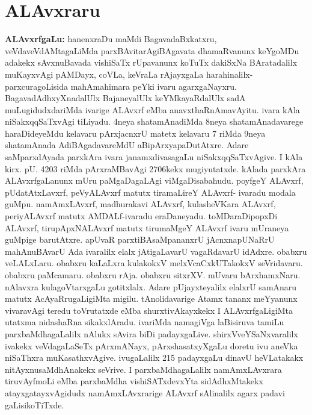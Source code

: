 \chapter{ALAvxraru}\label{chap008}

{\textbf{ALAvxrfgaLu:}} hanenxraDu maMdi BagavadaBxkatxru, veVdaveVdAMtagaLiMda parxBAvitarAgi\break BAgavata dhamaRvanunx keYgoMDu adakekx sAvxnuBavada vishiSaTx rUpavanunx koTuTx dakiSxNa BArata\-dalilx  muKayxvAgi pAMDayx, coVLa, keVraLa rAjayxgaLa harahinalilx-parxcuragoLisida mahAmahimara peYki ivaru agarxgaNayxru. BagavadAdhxyXnadalUlx BajaneyalUlx keYMkayaR\-dalUlx sadA muLugidudxdariMda ivarige ALAvxrf eMba anavxthaRnAmavAyitu. ivara kAla niSakxqqSaTxvAgi tiLiyadu. 4neya shatamAnadiMda 8neya shatamAnadavarege haraDideyeMdu kelavaru pArxjacnxrU matetx kelavaru 7 riMda 9neya shatamAnada AdiBAgadavareMdU aBipArxyapaDutAtxre. Adare saMparxdAyada parxkAra ivara janamxdivasagaLu niSakxqqSaTxvAgive. I kAla kirx. pU. 4203 riMda pArxraMBavAgi 2706kekx mugiyutatxde. kAlada parxkAra ALAvxrfgaLanunx mUru paMgaDagaLAgi viMgaDisabahudu. poyfgeY ALAvxrf, pUdatAtxLavxrf, peVyALAvxrf matutx tiramaLireY ALAvxrf- ivaradu modala guMpu. namAmxLAvxrf, madhurakavi ALAvxrf, kulasheVKara ALAvxrf, periyALAvxrf matutx AMDALf-ivaradu eraDaneyadu. toMDaraDipopxDi ALAvxrf, tirupApxNALAvxrf matutx tirumaMgeY ALAvxrf ivaru mUraneya guMpige barutAtxre. apUvaR parxtiBAsaMpananxrU jAcnxnapUNaRrU mahAnuBAvarU Ada ivaralilx elalx jAtigaLavarU vagaRdavarU idAdxre. obabxru veLALxLaru. obabxru kaLaLxra kulakokxV melxVcaCxkUTakokxV seVridavaru. obabxru paMcamaru. obabxru rAja. obabxru sitxrXV. mUvaru bArxhamxNaru. nAlavxra kulagoVtarxgaLu gotitxlalx. Adare pUjayxteyalilx elalxrU samAnaru matutx AcAyaRrugaLigiMta migilu. tAnolidavarige Atamx tananx meYyanunx vivaravAgi teredu toVrutatxde eMba shurxtivAkayxkekx I ALAvxrfgaLigiMta utatxma nidashaRna sikakxlAradu. ivariMda namagiVga laBisiruva tamiLu parxbaMdhagaLalilx nAlukx sAvira biDi padayxgaLive. shirxVveYSaNxvaralilx ivakekx veVdagaLaSeTx pArxmANayx, pArxshasatxyXgaLu doretu ivu aneVka niSaThxra muKasathxvAgive. ivugaLalilx 215 padayxgaLu dinavU heVLatakakx nitAyxnusaMdhAnakekx seVrive. I parxbaMdhagaLalilx namAmxLAvxrara tiruvAyfmoLi eMba parxbaMdha vishiSATxdevxYta sidAdhxMtakekx atayxgatayxvAgidudx namAmxLAvxrarige ALAvxrf sAlinalilx agarx padavi gaLisikoTiTxde.

